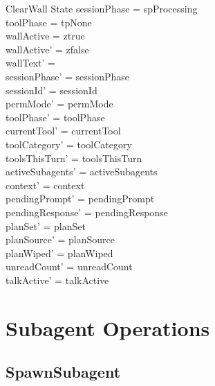 \documentclass[a4paper,10pt,fleqn]{article}
\begin{document}
\begin{schema}{ClearWall}
  \Delta State
  \where
  sessionPhase = spProcessing \\
  toolPhase = tpNone \\
  wallActive = ztrue \\
  wallActive' = zfalse \\
  wallText' = \emptyset \\
  sessionPhase' = sessionPhase \\
  sessionId' = sessionId \\
  permMode' = permMode \\
  toolPhase' = toolPhase \\
  currentTool' = currentTool \\
  toolCategory' = toolCategory \\
  toolsThisTurn' = toolsThisTurn \\
  activeSubagents' = activeSubagents \\
  context' = context \\
  pendingPrompt' = pendingPrompt \\
  pendingResponse' = pendingResponse \\
  planSet' = planSet \\
  planSource' = planSource \\
  planWiped' = planWiped \\
  unreadCount' = unreadCount \\
  talkActive' = talkActive
\end{schema}

\section{Subagent Operations}

\subsection{SpawnSubagent}
\end{document}

